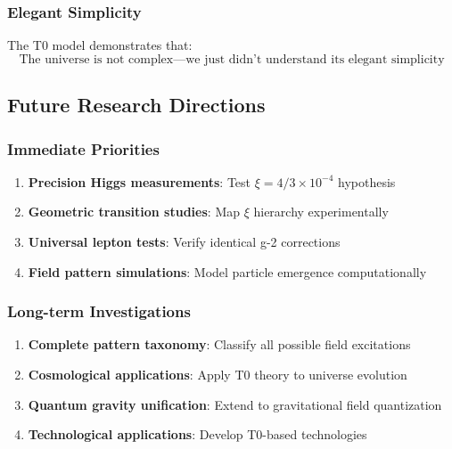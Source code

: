 \documentclass[12pt,a4paper]{article}
\newcommand{\xipar}{\ensuremath{\xi}}
\newcommand{\mytimes}{\ensuremath{\times}}
\begin{document}
	\subsubsection{Elegant Simplicity}
	\label{subsubsec:elegant_simplicity}
	
	The T0 model demonstrates that:
	\begin{equation}
		\boxed{\text{The universe is not complex---we just didn't understand its elegant simplicity}}
		\label{eq:elegant_truth}
	\end{equation}
	
	\subsection{Future Research Directions}
	\label{subsec:future_research}
	
	\subsubsection{Immediate Priorities}
	\label{subsubsec:immediate_priorities}
	
	\begin{enumerate}
		\item \textbf{Precision Higgs measurements}: Test $\xipar = 4/3 \mytimes 10^{-4}$ hypothesis
		\item \textbf{Geometric transition studies}: Map $\xi$ hierarchy experimentally
		\item \textbf{Universal lepton tests}: Verify identical g-2 corrections
		\item \textbf{Field pattern simulations}: Model particle emergence computationally
	\end{enumerate}
	
	\subsubsection{Long-term Investigations}
	\label{subsubsec:longterm_investigations}
	
	\begin{enumerate}
		\item \textbf{Complete pattern taxonomy}: Classify all possible field excitations
		\item \textbf{Cosmological applications}: Apply T0 theory to universe evolution
		\item \textbf{Quantum gravity unification}: Extend to gravitational field quantization
		\item \textbf{Technological applications}: Develop T0-based technologies
	\end{enumerate}
	
\end{document}
